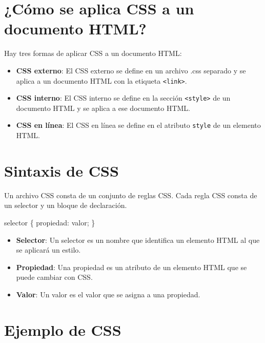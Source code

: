 \documentclass[
  a4paper,
  DIV=11,
  numbers=noendperiod,
  onepage,
  openany]{scrreprt}
\newenvironment{Shaded}{\begin{snugshade}}{\end{snugshade}}
\newcommand{\CharTok}[1]{\textcolor[rgb]{0.13,0.47,0.30}{#1}}
\newcommand{\DecValTok}[1]{\textcolor[rgb]{0.68,0.00,0.00}{#1}}
\newcommand{\NormalTok}[1]{\textcolor[rgb]{0.00,0.23,0.31}{#1}}
\newcommand{\OperatorTok}[1]{\textcolor[rgb]{0.37,0.37,0.37}{#1}}
\begin{document}
\begin{tcolorbox}
\section{¿Cómo se aplica CSS a un documento
HTML?}\label{cuxf3mo-se-aplica-css-a-un-documento-html}

Hay tres formas de aplicar CSS a un documento HTML:

\begin{itemize}
\item
  \textbf{CSS externo}: El CSS externo se define en un archivo .css
  separado y se aplica a un documento HTML con la etiqueta
  \texttt{\textless{}link\textgreater{}}.
\item
  \textbf{CSS interno}: El CSS interno se define en la sección
  \texttt{\textless{}style\textgreater{}} de un documento HTML y se
  aplica a ese documento HTML.
\item
  \textbf{CSS en línea}: El CSS en línea se define en el atributo
  \texttt{style} de un elemento HTML.
\end{itemize}

\section{Sintaxis de CSS}\label{sintaxis-de-css}

Un archivo CSS consta de un conjunto de reglas CSS. Cada regla CSS
consta de un selector y un bloque de declaración.

\begin{Shaded}
\begin{Highlighting}[]
\NormalTok{selector \{}
\NormalTok{  propiedad}\CharTok{:} \DecValTok{valor}\OperatorTok{;}
\NormalTok{\}}
\end{Highlighting}
\end{Shaded}

\begin{itemize}
\item
  \textbf{Selector}: Un selector es un nombre que identifica un elemento
  HTML al que se aplicará un estilo.
\item
  \textbf{Propiedad}: Una propiedad es un atributo de un elemento HTML
  que se puede cambiar con CSS.
\item
  \textbf{Valor}: Un valor es el valor que se asigna a una propiedad.
\end{itemize}

\section{Ejemplo de CSS}\label{ejemplo-de-css}


\end{tcolorbox}
\end{document}
